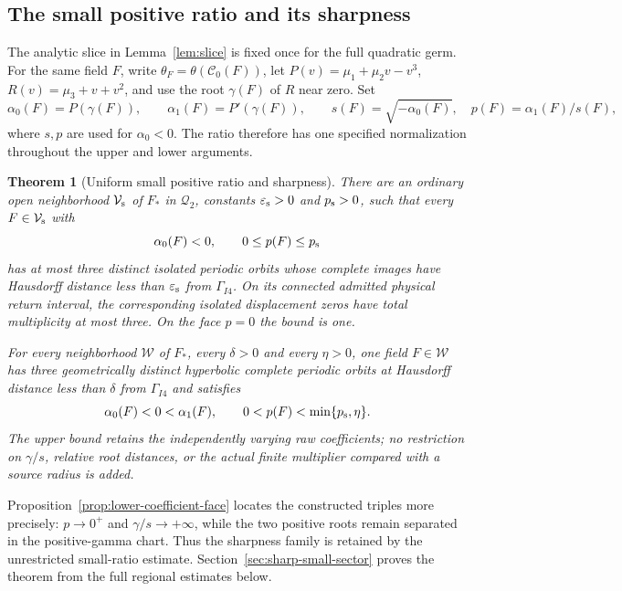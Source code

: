 \documentclass[a4paper,11pt]{article}
\numberwithin{equation}{section}
\newtheorem{theorem}{Theorem}[section]
\theoremstyle{definition}
\theoremstyle{remark}
\newcommand{\eps}{\varepsilon}
\begin{document}



\subsection{The small positive ratio and its sharpness}

The analytic slice in Lemma~\ref{lem:slice} is fixed once for the full
quadratic germ. For the same field $F$, write
$\theta_F=\theta(\mathscr C_0(F))$, let
$P(v)=\mu_1+\mu_2v-v^3$, $R(v)=\mu_3+v+v^2$, and use the root
$\gamma(F)$ of $R$ near zero. Set
\begin{equation}\label{eq:sharp-sector-coordinates}
 \alpha_0(F)=P(\gamma(F)),\qquad
 \alpha_1(F)=P'(\gamma(F)),\qquad
 s(F)=\sqrt{-\alpha_0(F)},\quad p(F)=\alpha_1(F)/s(F),
\end{equation}
where $s,p$ are used for $\alpha_0<0$. The ratio therefore has one
specified normalization throughout the upper and lower arguments.

\begin{theorem}[Uniform small positive ratio and sharpness]
\label{thm:small-sector}
There are an ordinary open neighborhood $\mathcal V_{\rm s}$ of $F_*$
in $\mathcal Q_2$, constants $\eps_{\rm s}>0$ and $p_{\rm s}>0$, such
that every $F\in\mathcal V_{\rm s}$ with
\[
 \alpha_0(F)<0,\qquad 0\le p(F)\le p_{\rm s}
\]
has at most three distinct isolated periodic orbits whose complete
images have Hausdorff distance less than $\eps_{\rm s}$ from
$\Gamma_{I4}$. On its connected admitted physical return interval,
the corresponding isolated displacement zeros have total multiplicity
at most three. On the face $p=0$ the bound is one.

For every neighborhood $\mathcal W$ of $F_*$, every $\delta>0$ and
every $\eta>0$, one field $F\in\mathcal W$ has three geometrically
distinct hyperbolic complete periodic orbits at Hausdorff distance
less than $\delta$ from $\Gamma_{I4}$ and satisfies
\[
 \alpha_0(F)<0<\alpha_1(F),\qquad
 0<p(F)<\min\{p_{\rm s},\eta\}.
\]
The upper bound retains the independently varying raw coefficients;
no restriction on $\gamma/s$, relative root distances, or the actual
finite multiplier compared with a source radius is added.
\end{theorem}

Proposition~\ref{prop:lower-coefficient-face} locates the constructed
triples more precisely: $p\to0^+$ and $\gamma/s\to+\infty$, while
the two positive roots remain separated in the positive-gamma chart.
Thus the sharpness family is retained by the unrestricted small-ratio
estimate. Section~\ref{sec:sharp-small-sector} proves the theorem from
the full regional estimates below.
\end{document}
